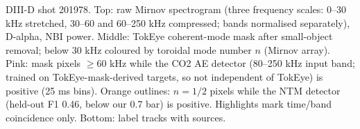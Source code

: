 \caption{DIII-D shot 201978. Top: raw Mirnov spectrogram (three frequency scales: 0--30 kHz stretched, 30--60 and 60--250 kHz compressed; bands normalised separately), D-alpha, NBI power. Middle: TokEye coherent-mode mask after small-object removal; below 30 kHz coloured by toroidal mode number $n$ (Mirnov array). Pink: mask pixels $\geq$60 kHz while the CO2 AE detector (80--250 kHz input band; trained on TokEye-mask-derived targets, so not independent of TokEye) is positive (25 ms bins). Orange outlines: $n=1/2$ pixels while the NTM detector (held-out F1 0.46, below our 0.7 bar) is positive. Highlights mark time/band coincidence only. Bottom: label tracks with sources.}
\label{fig:interpreter-201978}

